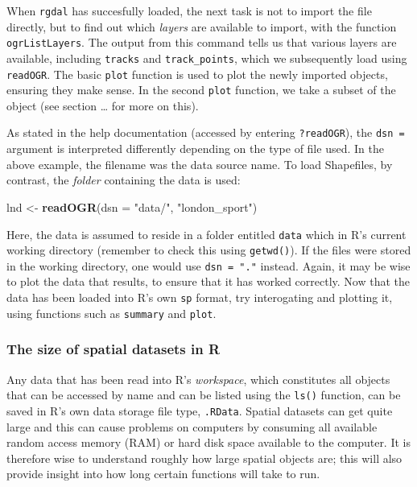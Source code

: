 \documentclass[]{article}
\newenvironment{Shaded}{}{}
\newcommand{\KeywordTok}[1]{\textcolor[rgb]{0.00,0.44,0.13}{\textbf{{#1}}}}
\newcommand{\DataTypeTok}[1]{\textcolor[rgb]{0.56,0.13,0.00}{{#1}}}
\newcommand{\StringTok}[1]{\textcolor[rgb]{0.25,0.44,0.63}{{#1}}}
\newcommand{\NormalTok}[1]{{#1}}
\begin{document}
When \texttt{rgdal} has succesfully loaded, the next task is not to
import the file directly, but to find out which \emph{layers} are
available to import, with the function \texttt{ogrListLayers}. The
output from this command tells us that various layers are available,
including \texttt{tracks} and \texttt{track\_points}, which we
subsequently load using \texttt{readOGR}. The basic \texttt{plot}
function is used to plot the newly imported objects, ensuring they make
sense. In the second \texttt{plot} function, we take a subset of the
object (see section \ldots{} for more on this).

As stated in the help documentation (accessed by entering
\texttt{?readOGR}), the \texttt{dsn =} argument is interpreted
differently depending on the type of file used. In the above example,
the filename was the data source name. To load Shapefiles, by contrast,
the \emph{folder} containing the data is used:

\begin{Shaded}
\begin{Highlighting}[]
\NormalTok{lnd <- }\KeywordTok{readOGR}\NormalTok{(}\DataTypeTok{dsn =} \StringTok{"data/"}\NormalTok{, }\StringTok{"london_sport"}\NormalTok{)}
\end{Highlighting}
\end{Shaded}
Here, the data is assumed to reside in a folder entitled \texttt{data}
which in R's current working directory (remember to check this using
\texttt{getwd()}). If the files were stored in the working directory,
one would use \texttt{dsn = "."} instead. Again, it may be wise to plot
the data that results, to ensure that it has worked correctly. Now that
the data has been loaded into R's own \texttt{sp} format, try
interogating and plotting it, using functions such as \texttt{summary}
and \texttt{plot}.

\subsubsection{The size of spatial datasets in R}

Any data that has been read into R's \emph{workspace}, which constitutes
all objects that can be accessed by name and can be listed using the
\texttt{ls()} function, can be saved in R's own data storage file type,
\texttt{.RData}. Spatial datasets can get quite large and this can cause
problems on computers by consuming all available random access memory
(RAM) or hard disk space available to the computer. It is therefore wise
to understand roughly how large spatial objects are; this will also
provide insight into how long certain functions will take to run.
\end{document}
